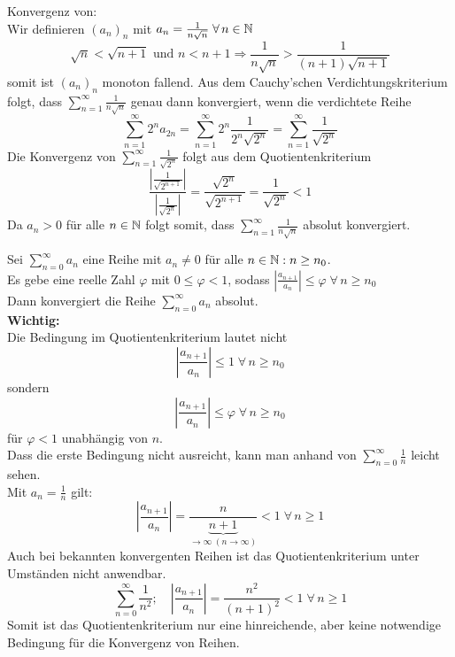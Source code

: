 \documentclass[../ana1u.tex]{subfiles}
\begin{document}
\begin{bsp}
    Konvergenz von: \\
    Wir definieren \((a_n)_n\) mit \(a_n = \frac{1}{n\sqrt{n}} \; \forall \, n \in \mathbb{N} \)
    \[\sqrt{n} < \sqrt{n+1} \text{ und } n < n+1 
    \Rightarrow \frac{1}{n\sqrt{n}} > \frac{1}{(n+1)\sqrt{n+1}} \]
    somit ist \((a_n)_n\) monoton fallend. Aus dem Cauchy'schen Verdichtungskriterium folgt, 
    dass \(\sum_{n=1}^{\infty} \frac{1}{n\sqrt{n}} \) genau dann konvergiert, wenn die 
    verdichtete Reihe
    \[\sum_{n=1}^{\infty} 2^n a_{2n} = \sum_{n=1}^{\infty} 2^n \frac{1}{2^n\sqrt{2^n}} 
    = \sum_{n=1}^{\infty} \frac{1}{\sqrt{2^n}} \]
    Die Konvergenz von \(\sum_{n=1}^{\infty} \frac{1}{\sqrt{2^n}}\) folgt aus dem Quotientenkriterium
    \[\frac{\left|\frac{1}{\sqrt{2^{n+1}}}\right|}{\left|\frac{1}{\sqrt{2^n}}\right|} 
    = \frac{\sqrt{2^n}}{\sqrt{2^{n+1}}} = \frac{1}{\sqrt{2^n}} < 1 \]
    Da \(a_n > 0\) für alle \(n \in \mathbb{N}\) folgt somit, dass 
    \(\sum_{n=1}^{\infty} \frac{1}{n\sqrt{n}} \) absolut konvergiert.
\end{bsp}
\begin{satz}[Quotientenkriterium]
    Sei \(\sum_{n=0}^{\infty} a_n\) eine Reihe mit \(a_n \neq 0\) für alle 
    \(n \in \mathbb{N}: n \geq n_0 \). \\
    Es gebe eine reelle Zahl \(\varphi\) mit \(0 \leq \varphi < 1\), sodass 
    \(\left|\frac{a_{n+1}}{a_n}\right| \leq \varphi \; \forall \, n \geq n_0 \) \\
    Dann konvergiert die Reihe \(\sum_{n=0}^{\infty} a_n \) absolut. \\
    \textbf{Wichtig:} \\
    Die Bedingung im Quotientenkriterium lautet nicht 
    \[\left|\frac{a_{n+1}}{a_n}\right| \leq 1 \; \forall \, n \geq n_0 \]
    sondern
    \[\left|\frac{a_{n+1}}{a_n}\right| \leq \varphi \; \forall \, n \geq n_0 \]
    für \(\varphi < 1\) unabhängig von \(n \).\\
    Dass die erste Bedingung nicht ausreicht, kann man anhand von 
    \(\sum_{n=0}^{\infty} \frac{1}{n} \) leicht sehen. \\
    Mit \(a_n = \frac{1}{n} \) gilt: 
    \[\left|\frac{a_{n+1}}{a_n}\right| 
    = \frac{n}{\underbrace{n+1}_{\rightarrow \infty \; (n \rightarrow \infty)}} < 1 
    \; \forall \, n \geq 1\]
    Auch bei bekannten konvergenten Reihen ist das Quotientenkriterium unter Umständen 
    nicht anwendbar.
    \[\sum_{n=0}^{\infty} \frac{1}{n^2}; \quad \left|\frac{a_{n+1}}{a_n}\right| 
    = \frac{n^2}{(n+1)^2} < 1 \; \forall \, n \geq 1 \]
    Somit ist das Quotientenkriterium nur eine hinreichende, aber keine notwendige Bedingung 
    für die Konvergenz von Reihen.
\end{satz}
\end{document}
